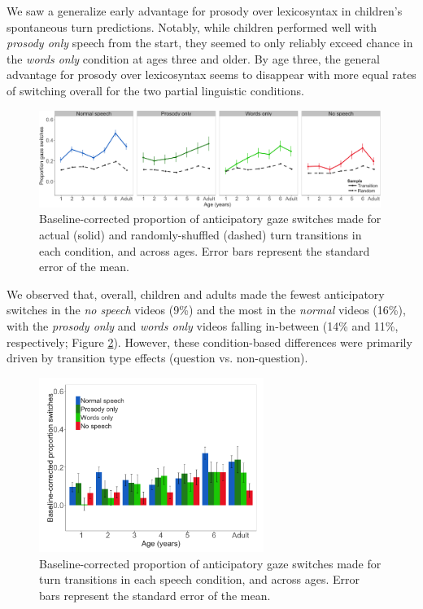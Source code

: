 \documentclass[authoryear, 12pt]{elsarticle}
\begin{document}
We saw a generalize early advantage for prosody over lexicosyntax in children's spontaneous turn predictions. Notably, while children performed well with \textit{prosody only} speech from the start, they seemed to only reliably exceed chance in the \textit{words only} condition at ages three and older. By age three, the general advantage for prosody over lexicosyntax seems to disappear with more equal rates of switching overall for the two partial linguistic conditions.

\begin{figure}[t]
\begin{center}
\includegraphics[width=0.99\textwidth]{figures/FIG-randvsreal-EN.png}
\end{center}
\caption{Baseline-corrected proportion of anticipatory gaze switches made for actual (solid) and randomly-shuffled (dashed) turn transitions in each condition, and across ages. Error bars represent the standard error of the mean.} 
\label{fig:randvsrealEN}
\end{figure}

We observed that, overall, children and adults made the fewest anticipatory switches in the \textit{no speech} videos (9\%) and the most in the \textit{normal} videos (16\%), with the \textit{prosody only} and \textit{words only} videos falling in-between (14\% and 11\%, respectively; Figure \ref{fig:conditionsEN}). However, these condition-based differences were primarily driven by transition type effects (question vs. non-question).

\begin{figure}[t]
\begin{center}
\includegraphics[width=0.65\textwidth]{figures/FIG-conditions-EN.png}
\end{center}
\caption{Baseline-corrected proportion of anticipatory gaze switches made for turn transitions in each speech condition, and across ages. Error bars represent the standard error of the mean.} 
\label{fig:conditionsEN}
\end{figure}
\end{document}
